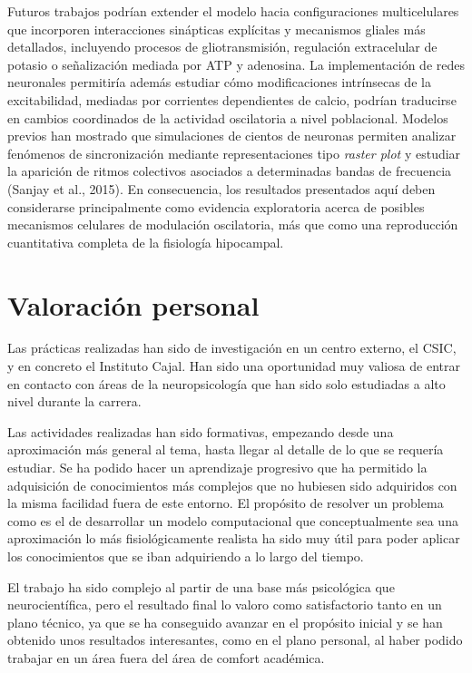 \documentclass[12pt,a4paper]{report}
\begin{document}
Futuros trabajos podrían extender el modelo hacia configuraciones multicelulares que incorporen interacciones sinápticas explícitas y mecanismos gliales más detallados, incluyendo procesos de gliotransmisión, regulación extracelular de potasio o señalización mediada por ATP y adenosina. La implementación de redes neuronales permitiría además estudiar cómo modificaciones intrínsecas de la excitabilidad, mediadas por corrientes dependientes de calcio, podrían traducirse en cambios coordinados de la actividad oscilatoria a nivel poblacional. Modelos previos han mostrado que simulaciones de cientos de neuronas permiten analizar fenómenos de sincronización mediante representaciones tipo \textit{raster plot} y estudiar la aparición de ritmos colectivos asociados a determinadas bandas de frecuencia (Sanjay et al., 2015). En consecuencia, los resultados presentados aquí deben considerarse principalmente como evidencia exploratoria acerca de posibles mecanismos celulares de modulación oscilatoria, más que como una reproducción cuantitativa completa de la fisiología hipocampal.


\chapter{Valoración personal}

Las prácticas realizadas han sido de investigación en un centro externo, el CSIC, y en concreto el Instituto Cajal. Han sido una oportunidad muy valiosa de entrar en contacto con áreas de la neuropsicología que han sido solo estudiadas a alto nivel durante la carrera. 

Las actividades realizadas han sido formativas, empezando desde una aproximación más general al tema, hasta llegar al detalle de lo que se requería estudiar. Se ha podido hacer un aprendizaje progresivo que ha permitido la adquisición de conocimientos más complejos que no hubiesen sido adquiridos con la misma facilidad fuera de este entorno. El propósito de resolver un problema como es el de desarrollar un modelo computacional que conceptualmente sea una aproximación lo más fisiológicamente realista ha sido muy útil para poder aplicar los conocimientos que se iban adquiriendo a lo largo del tiempo. 

El trabajo ha sido complejo al partir de una base más psicológica que neurocientífica, pero el resultado final lo valoro como satisfactorio tanto en un plano técnico, ya que se ha conseguido avanzar en el propósito inicial y se han obtenido unos resultados interesantes, como en el plano personal, al haber podido trabajar en un área fuera del área de comfort académica. 
\end{document}
